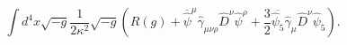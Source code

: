 \begin{equation}
\int d^4x \sqrt{-g} \frac{1}{2\kappa^2}\sqrt{-g}(R(g)+\overline{\hat \psi}^\mu\hat
\gamma_{\mu\nu\rho}\hat D^{\nu}\hat\psi^{\rho}+\frac{3}{2}\overline{\hat \psi_5}\hat
\gamma_{\mu}\hat D^{\nu}\hat\psi_5  ). 
\end{equation}

